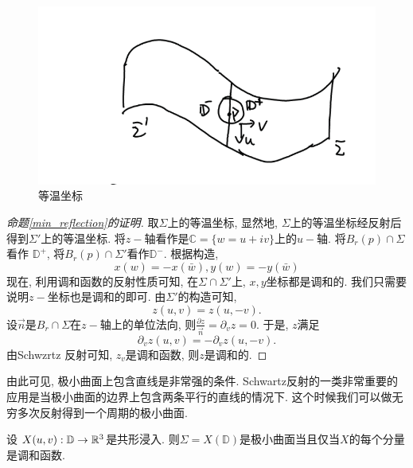 \begin{figure}[ht]
	\centering
	\includegraphics[scale=0.8]{images/reflection2.png}
	\caption{等温坐标}
	\label{reflection2}
\end{figure}
\begin{proof}[命题\eqref{min_reflection}的证明]
    取$\Sigma$上的等温坐标, 显然地, $\Sigma$上的等温坐标经反射后得到$\Sigma'$上的等温坐标. 将$z-$轴看作是$\mathbb{C}=\{w=u+iv\}$上的$u-$轴. 将$B_r(p)\cap \Sigma$看作 $\mathbb{D}^+$, 将$B_r(p) \cap \Sigma'$看作$\mathbb{D}^-$. 根据构造, 
    \begin{equation}
        x(w)=-x(\bar{w}), y(w)=-y(\bar{w})
    \end{equation}
    现在, 利用调和函数的反射性质可知, 在$\Sigma \cap \Sigma'$上, $x,y$坐标都是调和的. 我们只需要说明$z-$坐标也是调和的即可. 由$\Sigma'$的构造可知, 
    \begin{equation}
        z(u,v)=z(u,-v). 
    \end{equation}
    设$\vec{n}$是$B_r\cap \Sigma$在$z-$轴上的单位法向, 则$\frac{\partial z}{\vec{n}}= \partial_v{z}=0$. 于是, $z$满足 
    \begin{equation}
        \partial_v z(u,v)=-\partial_v z(u,-v). 
    \end{equation}
    由Schwzrtz 反射可知, $z_v$是调和函数, 则$z$是调和的. 
\end{proof}
\begin{remark}
    由此可见, 极小曲面上包含直线是非常强的条件. Schwartz反射的一类非常重要的应用是当极小曲面的边界上包含两条平行的直线的情况下.  这个时候我们可以做无穷多次反射得到一个周期的极小曲面.
\end{remark}
\begin{proposition} \label{conformal_im}
    设 $X(u,v): \mathbb{D} \to \mathbb{R}^3$是共形浸入. 则$\Sigma = X(\mathbb{D})$是极小曲面当且仅当$X$的每个分量是调和函数.
\end{proposition}
